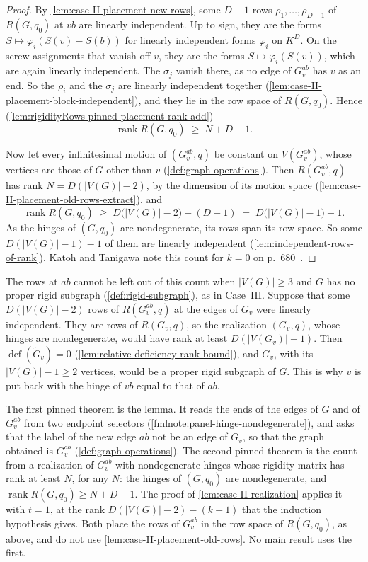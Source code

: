 \begin{proof}
  By \cref{lem:case-II-placement-new-rows}, some $D - 1$ rows
  $\rho_1, \dots, \rho_{D-1}$ of $R(G, q_0)$ at $vb$ are linearly
  independent. Up to sign, they are the forms
  $S \mapsto \varphi_i(S(v) - S(b))$ for linearly independent forms
  $\varphi_i$ on $K^D$. On the screw assignments that vanish off $v$, they
  are the forms $S \mapsto \varphi_i(S(v))$, which are again linearly
  independent. The $\sigma_j$ vanish there, as no edge of $G_v^{ab}$ has
  $v$ as an end. So the $\rho_i$ and the $\sigma_j$ are linearly
  independent together (\cref{lem:case-II-placement-block-independent}),
  and they lie in the row space of $R(G, q_0)$. Hence
  (\cref{lem:rigidityRows-pinned-placement-rank-add})
  \[
    \operatorname{rank} R(G, q_0) \;\ge\; N + D - 1.
  \]

  Now let every infinitesimal motion of $(G_v^{ab}, q)$ be constant on
  $V(G_v^{ab})$, whose vertices are those of $G$ other than $v$
  (\cref{def:graph-operations}). Then $R(G_v^{ab}, q)$ has rank
  $N = D(|V(G)| - 2)$, by the dimension of its motion space
  (\cref{lem:case-II-placement-old-rows-extract}), and
  \[
    \operatorname{rank} R(G, q_0) \;\ge\;
      D\bigl(|V(G)| - 2\bigr) + (D - 1) \;=\; D\bigl(|V(G)| - 1\bigr) - 1.
  \]
  As the hinges of $(G, q_0)$ are nondegenerate, its rows span its row
  space. So some $D(|V(G)| - 1) - 1$ of them are linearly independent
  (\cref{lem:independent-rows-of-rank}). Katoh and Tanigawa note this
  count for $k = 0$ on p.~680~\cite{katohTanigawa2011}.
\end{proof}

The rows at $ab$ cannot be left out of this count when $|V(G)| \ge 3$
and $G$ has no proper rigid subgraph (\cref{def:rigid-subgraph}), as in
Case~III. Suppose that some $D(|V(G)| - 2)$ rows of $R(G_v^{ab}, q)$ at
the edges of $G_v$ were linearly independent. They are rows of
$R(G_v, q)$, so the realization $(G_v, q)$, whose hinges are
nondegenerate, would have rank at least $D(|V(G_v)| - 1)$. Then
$\operatorname{def}(\tilde G_v) = 0$
(\cref{lem:relative-deficiency-rank-bound}), and $G_v$, with its
$|V(G)| - 1 \ge 2$ vertices, would be a proper rigid subgraph of $G$.
This is why $v$ is put back with the hinge of $vb$ equal to that of
$ab$.

\begin{fmlnote}
  The first pinned theorem is the lemma. It reads the ends of the edges
  of $G$ and of $G_v^{ab}$ from two endpoint selectors
  (\cref{fmlnote:panel-hinge-nondegenerate}), and asks that the label of
  the new edge $ab$ not be an edge of $G_v$, so that the graph obtained
  is $G_v^{ab}$ (\cref{def:graph-operations}). The second pinned theorem
  is the count from a realization of $G_v^{ab}$ with nondegenerate hinges
  whose rigidity matrix has rank at least $N$, for any $N$: the hinges of
  $(G, q_0)$ are nondegenerate, and $\operatorname{rank} R(G, q_0) \ge N
  + D - 1$. The proof of \cref{lem:case-II-realization} applies it with
  $t = 1$, at the rank $D(|V(G)| - 2) - (k - 1)$ that the induction
  hypothesis gives. Both place the rows of $G_v^{ab}$ in the row space of
  $R(G, q_0)$, as above, and do not use
  \cref{lem:case-II-placement-old-rows}. No main result uses the first.
\end{fmlnote}
